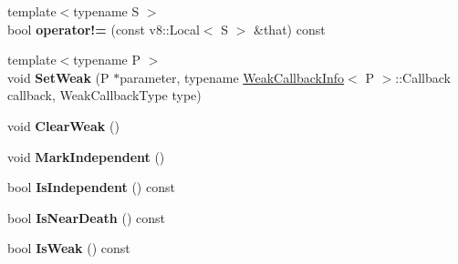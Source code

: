 \begin{DoxyCompactItemize}
\item 
\mbox{\label{class_persistent_base_af92f868d96b415eab5e8975d58a69802}} 
{\footnotesize template$<$typename S $>$ }\\bool {\bfseries operator!=} (const v8\+::\+Local$<$ S $>$ \&that) const
\item 
\mbox{\label{class_persistent_base_abca5a8d5f69f235307238d56b934eee3}} 
{\footnotesize template$<$typename P $>$ }\\void {\bfseries Set\+Weak} (P $\ast$parameter, typename \hyperlink{class_weak_callback_info}{Weak\+Callback\+Info}$<$ P $>$\+::Callback callback, Weak\+Callback\+Type type)
\item 
\mbox{\label{class_persistent_base_a6d06225b41ddb49b42897871775fc51b}} 
void {\bfseries Clear\+Weak} ()
\item 
\mbox{\label{class_persistent_base_ad0bd3b13b99a46ee8bf8ad0c8a493a79}} 
void {\bfseries Mark\+Independent} ()
\item 
\mbox{\label{class_persistent_base_a1786e5f36d7e00866e5af1d7b011f97a}} 
bool {\bfseries Is\+Independent} () const
\item 
\mbox{\label{class_persistent_base_ae0a0935191a19e7026e179a5d316cab9}} 
bool {\bfseries Is\+Near\+Death} () const
\item 
\mbox{\label{class_persistent_base_afbfc214cc4a3f4ff913d532628be9a2e}} 
bool {\bfseries Is\+Weak} () const
\end{DoxyCompactItemize}
